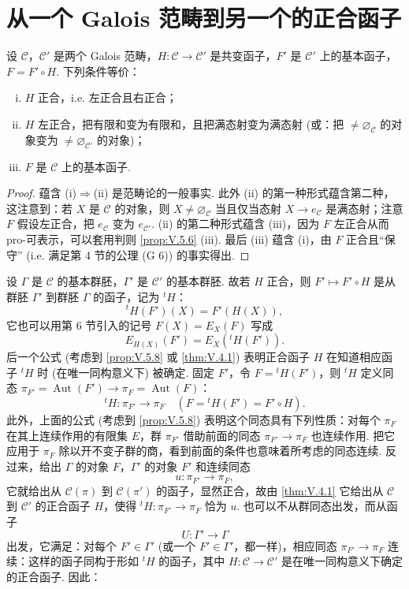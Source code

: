 \section{从一个 Galois 范畴到另一个的正合函子}

\begin{proposition}\label{prop:V.6.1}
设 $\mathcal{C}$，$\mathcal{C}'$ 是两个 Galois 范畴，$H \colon \mathcal{C} \to \mathcal{C}'$ 是共变函子，$F'$ 是 $\mathcal{C}'$ 上的基本函子，$F = F' \circ H$. 下列条件等价：
\begin{enumerate}[(i)]
\item $H$ 正合，i.e. 左正合且右正合；
\item $H$ 左正合，把有限和变为有限和，且把满态射变为满态射 (或：把 $\neq \varnothing_{\mathcal{C}}$ 的对象变为 $\neq \varnothing_{\mathcal{C}'}$ 的对象)；
\item $F$ 是 $\mathcal{C}$ 上的基本函子.
\end{enumerate}
\end{proposition}

\begin{proof}
蕴含 (i)$\Rightarrow$(ii) 是范畴论的一般事实. 此外 (ii) 的第一种形式蕴含第二种，这注意到：若 $X$ 是 $\mathcal{C}$ 的对象，则 $X \neq \varnothing_{\mathcal{C}}$ 当且仅当态射 $X \to e_{\mathcal{C}}$ 是满态射；注意 $F$ 假设左正合，把 $e_{\mathcal{C}}$ 变为 $e_{\mathcal{C}'}$. (ii) 的第二种形式蕴含 (iii)，因为 $F$ 左正合从而 pro-可表示，可以套用判则 \ref{prop:V.5.6} (iii). 最后 (iii) 蕴含 (i)，由 $F$ 正合且``保守'' (i.e. 满足第 4 节的公理 (G 6)) 的事实得出.
\end{proof}

设 $\Gamma$ 是 $\mathcal{C}$ 的基本群胚，$\Gamma'$ 是 $\mathcal{C}'$ 的基本群胚. 故若 $H$ 正合，则 $F' \mapsto F' \circ H$ 是从群胚 $\Gamma'$ 到群胚 $\Gamma$ 的函子，记为 ${}^{t}H$：
\[
{}^{t}H(F')(X) = F'(H(X)),
\]
它也可以用第 6 节引入的记号 $F(X) = E_X(F)$ 写成
\[
E_{H(X)}(F') = E_X({}^{t}H(F')).
\]
后一个公式 (考虑到 \ref{prop:V.5.8} 或 \ref{thm:V.4.1}) 表明正合函子 $H$ 在知道相应函子 ${}^{t}H$ 时 (在唯一同构意义下) 被确定. 固定 $F'$，令 $F = {}^{t}H(F')$，则 ${}^{t}H$ 定义同态 $\pi_{F'} = \operatorname{Aut}(F') \to \pi_F = \operatorname{Aut}(F)$：
\[
{}^{t}H \colon \pi_{F'} \longrightarrow \pi_F \quad (F = {}^{t}H(F') = F' \circ H).
\]
此外，上面的公式 (考虑到 \ref{prop:V.5.8}) 表明这个同态具有下列性质：对每个 $\pi_F$ 在其上连续作用的有限集 $E$，群 $\pi_{F'}$ 借助前面的同态 $\pi_{F'} \to \pi_F$ 也连续作用. 把它应用于 $\pi_F$ 除以开不变子群的商，看到前面的条件也意味着所考虑的同态连续. 反过来，给出 $\Gamma$ 的对象 $F$，$\Gamma'$ 的对象 $F'$ 和连续同态
\[
u \colon \pi_{F'} \longrightarrow \pi_F,
\]
它就给出从 $\mathcal{C}(\pi)$ 到 $\mathcal{C}(\pi')$ 的函子，显然正合，故由 \ref{thm:V.4.1} 它给出从 $\mathcal{C}$ 到 $\mathcal{C}'$ 的正合函子 $H$，使得 ${}^{t}H \colon \pi_{F'} \to \pi_F$ 恰为 $u$. 也可以不从群同态出发，而从函子
\[
U \colon \Gamma' \longrightarrow \Gamma
\]
出发，它满足：对每个 $F' \in \Gamma'$ (或一个 $F' \in \Gamma'$，都一样)，相应同态 $\pi_{F'} \to \pi_F$ 连续：这样的函子同构于形如 ${}^{t}H$ 的函子，其中 $H \colon \mathcal{C} \to \mathcal{C}'$ 是在唯一同构意义下确定的正合函子. 因此：

